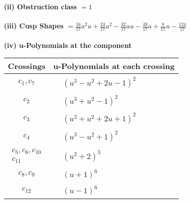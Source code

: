 \documentclass[1p]{elsarticle_modified}
\theoremstyle{definition}
\begin{document}
\flushleft \textbf{(ii) Obstruction class $= 1$}\\~\\
\flushleft \textbf{(iii) Cusp Shapes $= \frac{16}{17} a^2 u+\frac{24}{17} a^2-\frac{32}{17} a u-\frac{48}{17} a+\frac{8}{17} u-\frac{124}{17}$}\\~\\
\newpage\renewcommand{\arraystretch}{1}
\flushleft \textbf{(iv) u-Polynomials at the component}\newline \\
\begin{tabular}{m{50pt}|m{274pt}}
Crossings & \hspace{64pt}u-Polynomials at each crossing \\
\hline $$\begin{aligned}c_{1},c_{7}\end{aligned}$$&$\begin{aligned}
&(u^3- u^2+2 u-1)^2
\end{aligned}$\\
\hline $$\begin{aligned}c_{2}\end{aligned}$$&$\begin{aligned}
&(u^3+u^2-1)^2
\end{aligned}$\\
\hline $$\begin{aligned}c_{3}\end{aligned}$$&$\begin{aligned}
&(u^3+u^2+2 u+1)^2
\end{aligned}$\\
\hline $$\begin{aligned}c_{4}\end{aligned}$$&$\begin{aligned}
&(u^3- u^2+1)^2
\end{aligned}$\\
\hline $$\begin{aligned}c_{5},c_{6},c_{10}\\c_{11}\end{aligned}$$&$\begin{aligned}
&(u^2+2)^3
\end{aligned}$\\
\hline $$\begin{aligned}c_{8},c_{9}\end{aligned}$$&$\begin{aligned}
&(u+1)^6
\end{aligned}$\\
\hline $$\begin{aligned}c_{12}\end{aligned}$$&$\begin{aligned}
&(u-1)^6
\end{aligned}$\\
\hline
\end{tabular}\\~\\
\end{document}
